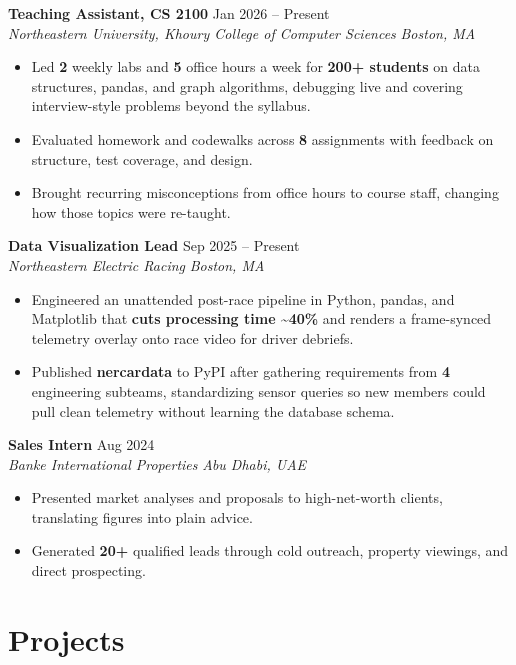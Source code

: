 \documentclass[letterpaper,10pt]{article}
\newcommand{\entrysize}{\fontsize{10.5}{12}\selectfont}
\newif\ifentrygap
\newcommand{\entrygapsize}{6pt}
\newcommand{\entryfirstgap}{0.4pt}
\newcommand{\entrysep}{\ifentrygap\vspace{\entrygapsize}\else\vspace{\entryfirstgap}\fi\global\entrygaptrue}
\let\entryorigsection\section
\renewcommand{\section}{\global\entrygapfalse\entryorigsection}
\newcommand{\entry}[4]{\entrysep{\entrysize\textbf{#1}} \hfill #2 \\ \textit{#3} \hfill \textit{#4}}
\begin{document}
\entry{Teaching Assistant, CS 2100}{Jan 2026 -- Present}
      {Northeastern University, Khoury College of Computer Sciences}{Boston, MA}
\begin{itemize}
  \item Led \textbf{2} weekly labs and \textbf{5} office hours a week for \textbf{200+ students} on data structures, pandas, and graph
        algorithms, debugging live and covering interview-style problems beyond the syllabus.
  \item Evaluated homework and codewalks across \textbf{8} assignments with feedback on structure, test coverage, and design.
  \item Brought recurring misconceptions from office hours to course staff, changing how those topics were re-taught.
\end{itemize}

\entry{Data Visualization Lead}{Sep 2025 -- Present}
      {Northeastern Electric Racing}{Boston, MA}
\begin{itemize}
  \item Engineered an unattended post-race pipeline in Python, pandas, and Matplotlib that \textbf{cuts processing time
        \textasciitilde40\%} and renders a frame-synced telemetry overlay onto race video for driver debriefs.
  \item Published \textbf{nercardata} to PyPI after gathering requirements from \textbf{4} engineering subteams,
        standardizing sensor queries so new members could pull clean telemetry without learning the database schema.
\end{itemize}

\entry{Sales Intern}{Aug 2024}
      {Banke International Properties}{Abu Dhabi, UAE}
\begin{itemize}
  \item Presented market analyses and proposals to high-net-worth clients, translating figures into plain advice.
  \item Generated \textbf{20+} qualified leads through cold outreach, property viewings, and direct prospecting.
\end{itemize}

\section{Projects}
\end{document}
